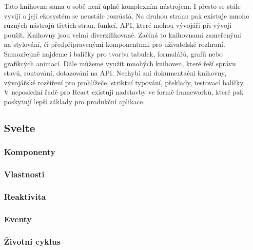 Tato knihovna sama o sobě není úplně komplexním nástrojem. I přesto se stále vyvíjí a její ekosystém se neustále rozrůstá. 
Na druhou stranu pak existuje mnoho různých nástrojů třetích stran, funkcí, API, které mohou vývojáři při vývoji použít.
Knihovny jsou velmi diverzifikované. Začíná to knihovnami zameřenými na stylování, či předpřipravenými komponentami pro uživatelské rozhraní. 
Samozřejmě najdeme i balíčky pro tvorbu tabulek, formulářů, grafů nebo grafikcých animací.
Dále můžeme využít mnohých knihoven, které řeší správu stavů, routování, dotazování na API. 
Nechybí ani dokumentační knihovny, vývojářské rozšíření pro prohlížeče, striktní typování, překlady, testovací balíčky. 
V neposlední řadě pro React existují nadstavby ve formě frameworků, které pak poskytují lepší základy pro produkční aplikace.\cite{awesomereact,builderreacteco,react}

\subsection{Svelte}


\subsubsection{Komponenty}
\subsubsection{Vlastnosti}
\subsubsection{Reaktivita}
\subsubsection{Eventy}
\subsubsection{Životní cyklus}
